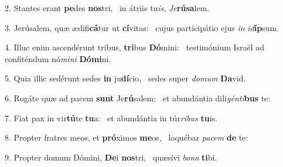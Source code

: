 2. Stantes erant \textbf{pe}des \textbf{nos}tri, \ast\  in átriis tu\textit{is}, \textit{Je}\textbf{rú}\textbf{sa}lem.\

3. Jerúsalem, quæ ædifi\textbf{cá}tur ut \textbf{cí}vitas: \ast\  cujus participátio ejus \textit{in} \textit{id}\textbf{íp}sum.\

4. Illuc enim ascendérunt tribus, \textbf{tri}bus \textbf{Dó}mini: \ast\  testimónium Israël ad confiténdum nó\textit{mi}\textit{ni} \textbf{Dó}\textbf{mi}ni.\

5. Quia illic sedérunt sedes \textbf{in} ju\textbf{dí}cio, \ast\  sedes super \textit{do}\textit{mum} \textbf{Da}vid.\

6. Rogáte quæ ad pacem \textbf{sunt} Je\textbf{rú}salem: \ast\  et abundántia dili\textit{gén}\textit{ti}\textbf{bus} te:\

7. Fiat pax in vir\textbf{tú}te \textbf{tu}a: \ast\  et abundántia in túr\textit{ri}\textit{bus} \textbf{tu}is.\

8. Propter fratres meos, et \textbf{pró}ximos \textbf{me}os, \ast\  loquébar \textit{pa}\textit{cem} \textbf{de} te:\

9. Propter domum Dómini, \textbf{De}i \textbf{nos}tri, \ast\  quæsívi \textit{bo}\textit{na} \textbf{ti}bi.\

